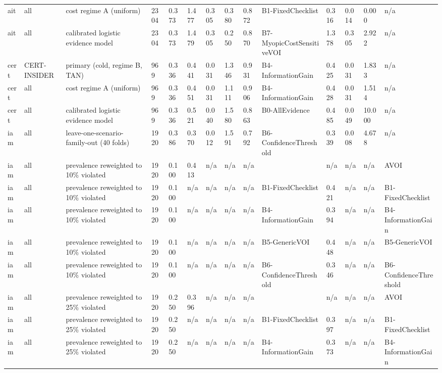 \begin{table}[!ht]
{\begin{tabular}{llllllllllllll}
ait & all & cost regime A (uniform) & 2304 & 0.373 & 1.477 & 0.305 & 0.380 & 0.872 & B1-FixedChecklist & 0.316 & 0.014 & 0.000 & n/a \\
ait & all & calibrated logistic evidence model & 2304 & 0.373 & 1.479 & 0.305 & 0.250 & 0.870 & B7-MyopicCostSensitiveVOI & 1.378 & 0.305 & 2.922 & n/a \\
cert & CERT-INSIDER & primary (cold, regime B, TAN) & 969 & 0.336 & 0.441 & 0.031 & 1.346 & 0.931 & B4-InformationGain & 0.425 & 0.031 & 1.833 & n/a \\
cert & all & cost regime A (uniform) & 969 & 0.336 & 0.451 & 0.031 & 1.111 & 0.906 & B4-InformationGain & 0.428 & 0.031 & 1.514 & n/a \\
cert & all & calibrated logistic evidence model & 969 & 0.336 & 0.521 & 0.040 & 1.580 & 0.863 & B0-AllEvidence & 0.485 & 0.049 & 10.000 & n/a \\
iam & all & leave-one-scenario-family-out (40 folds) & 1920 & 0.386 & 0.370 & 0.012 & 1.591 & 0.792 & B6-ConfidenceThreshold & 0.339 & 0.008 & 4.678 & n/a \\
iam & all & prevalence reweighted to 10\% violated & 1920 & 0.100 & 0.413 & n/a & n/a & n/a &  & n/a & n/a & n/a & AVOI \\
iam & all & prevalence reweighted to 10\% violated & 1920 & 0.100 & n/a & n/a & n/a & n/a & B1-FixedChecklist & 0.421 & n/a & n/a & B1-FixedChecklist \\
iam & all & prevalence reweighted to 10\% violated & 1920 & 0.100 & n/a & n/a & n/a & n/a & B4-InformationGain & 0.394 & n/a & n/a & B4-InformationGain \\
iam & all & prevalence reweighted to 10\% violated & 1920 & 0.100 & n/a & n/a & n/a & n/a & B5-GenericVOI & 0.448 & n/a & n/a & B5-GenericVOI \\
iam & all & prevalence reweighted to 10\% violated & 1920 & 0.100 & n/a & n/a & n/a & n/a & B6-ConfidenceThreshold & 0.346 & n/a & n/a & B6-ConfidenceThreshold \\
iam & all & prevalence reweighted to 25\% violated & 1920 & 0.250 & 0.396 & n/a & n/a & n/a &  & n/a & n/a & n/a & AVOI \\
iam & all & prevalence reweighted to 25\% violated & 1920 & 0.250 & n/a & n/a & n/a & n/a & B1-FixedChecklist & 0.397 & n/a & n/a & B1-FixedChecklist \\
iam & all & prevalence reweighted to 25\% violated & 1920 & 0.250 & n/a & n/a & n/a & n/a & B4-InformationGain & 0.373 & n/a & n/a & B4-InformationGain \\

\end{tabular}}
\end{table}
